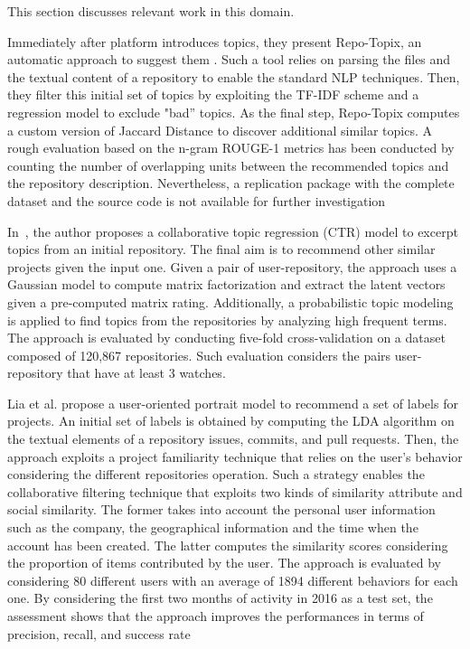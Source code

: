 This section discusses relevant work in this domain.




Immediately after \GH platform introduces topics, they present Repo-Topix, an automatic approach to suggest them \cite{ganesan_topic_2017}. Such a tool relies on parsing the \RM files and the textual content of a repository to enable the standard NLP techniques. Then, they filter this initial set of topics by exploiting the TF-IDF scheme and a regression model to exclude "bad'' topics. As the final step, Repo-Topix computes a custom version of Jaccard Distance to discover additional similar topics. A rough evaluation based on the n-gram ROUGE-1 metrics has been conducted by counting the number of overlapping units between the recommended topics and the repository description. Nevertheless, a replication package with the complete dataset and the source code is not available for further investigation

In~\cite{orii_modeling_2013}, the author proposes a collaborative topic regression (CTR) model to excerpt topics from an initial \GH repository. The final aim is to recommend other similar projects given the input one. Given a pair of user-repository, the approach uses a Gaussian model to compute matrix factorization and extract the latent vectors given a pre-computed matrix rating. Additionally, a probabilistic topic modeling is applied to find topics from the repositories by analyzing high frequent terms. The approach is evaluated by conducting five-fold cross-validation on a dataset composed of  120,867 repositories. Such evaluation considers the pairs user-repository that have at least 3 watches. 

Lia et al. \cite{liao_user_2018} propose a user-oriented portrait model to recommend a set of labels for \GH projects. An initial set of labels is obtained by computing the LDA algorithm on the textual elements of a repository \ie issues, commits, and pull requests. Then, the approach exploits a project familiarity technique that relies on the user's behavior considering the different repositories operation. Such a strategy enables the collaborative filtering technique that exploits two kinds of similarity \ie attribute and social similarity. The former takes into account the personal user information such as the company, the geographical information and the time when the account has been created. The latter computes the similarity scores considering the proportion of items contributed by the user. The approach is evaluated by considering 80 different users with an average of 1894 different behaviors for each one. By considering the first two months of activity in 2016 as a test set, the assessment shows that the approach improves the performances in terms of precision, recall, and success rate


